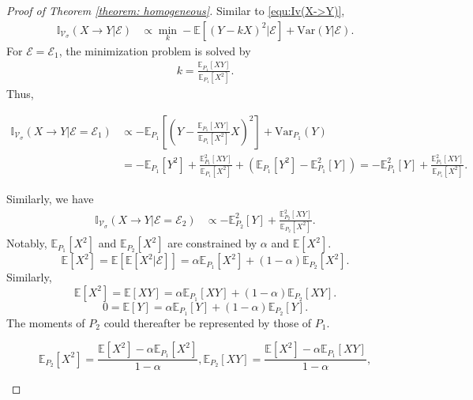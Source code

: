 \begin{proof}[Proof of Theorem \ref{theorem: homogeneous}]
Similar to \ref{equ:Iv(X->Y)},
\begin{align}
\label{equ:Iv(X->Y|e)}
    \mathbb{I}_{\mathcal{V}_\sigma}(X\rightarrow Y|\mathcal E) &\propto \min_k -\mathbb{E}[(Y-kX)^2|\mathcal E] + \text{Var}(Y|\mathcal E).
\end{align}
For $\mathcal E=\mathcal E_1$, the minimization problem is solved by
\begin{align}
    k = \frac{\mathbb E_{P_1}[XY]}{\mathbb E_{P_1}[X^2]}.
\end{align}
Thus,
\begin{small}
\begin{align}
    \mathbb{I}_{\mathcal{V}_\sigma}(X\rightarrow Y|\mathcal E=\mathcal E_1) &\propto -\mathbb E_{P_1}\left[\left(Y-\frac{\mathbb E_{P_1}[XY]}{\mathbb E_{P_1}[X^2]}X\right)^2\right] + \text{Var}_{P_1}(Y) \\
    &= -\mathbb E_{P_1}[Y^2] + \frac{\mathbb E_{P_1}^2[XY]}{\mathbb E_{P_1}[X^2]} + (\mathbb E_{P_1}[Y^2] - \mathbb E_{P_1}^2[Y]) 
    = -\mathbb E_{P_1}^2[Y] + \frac{\mathbb E_{P_1}^2[XY]}{\mathbb E_{P_1}[X^2]}.
\end{align}
\end{small}
Similarly, we have
\begin{align}
\label{equ:Iv(X->Y|e_2)}
    \mathbb{I}_{\mathcal{V}_\sigma}(X\rightarrow Y|\mathcal E=\mathcal E_2) &\propto -\mathbb E_{P_2}^2[Y] + \frac{\mathbb E_{P_2}^2[XY]}{\mathbb E_{P_2}[X^2]}.
\end{align}
Notably, $\mathbb E_{P_1}[X^2]$ and $\mathbb E_{P_2}[X^2]$ are constrained by $\alpha$ and $\mathbb E[X^2]$.
\begin{equation}
    \mathbb E[X^2] = \mathbb E[\mathbb E[X^2|\mathcal E]] = \alpha \mathbb E_{P_1}[X^2] + (1-\alpha)\mathbb E_{P_2}[X^2].
\end{equation}
Similarly,
\begin{equation}
    \mathbb E[X^2] = \mathbb E[XY] = \alpha \mathbb E_{P_1}[XY] + (1-\alpha)\mathbb E_{P_2}[XY].
\end{equation}
\begin{equation}
    0 =\mathbb E[Y] = \alpha \mathbb E_{P_1}[Y] + (1-\alpha)\mathbb E_{P_2}[Y].
\end{equation}
The moments of $P_2$ could thereafter be represented by those of $P_1$.
\begin{small}
\begin{equation}
    \mathbb E_{P_2}[X^2] = \frac{\mathbb E[X^2] - \alpha \mathbb E_{P_1}[X^2]}{1-\alpha},
    \mathbb E_{P_2}[XY] = \frac{\mathbb E[X^2] - \alpha \mathbb E_{P_1}[XY]}{1-\alpha},

\end{equation}
\end{small}
\end{proof}

